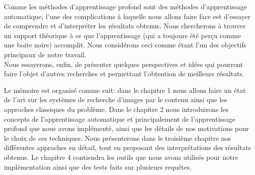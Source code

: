 	Comme les méthodes d’apprentissage profond sont des méthodes d'apprentissage automatique, l'une des complications à laquelle nous allons faire face est d'essayer de comprendre et d'interpréter les résultats obtenus. Nous chercherons à trouver un support théorique à ce que l'apprentissage (qui a toujours été perçu comme une boite noire) accomplit. Nous considérons ceci comme étant l'un des objectifs principaux de notre travail.\\


	Nous essayerons, enfin, de présenter quelques perspectives et idées qui pourront faire l'objet d'autres recherches et permettant l'obtention de meilleurs résultats.

	Le mémoire est organisé comme suit: dans le chapitre 1 nous allons faire un état de l'art sur les systèmes de recherche d'images par le contenu ainsi que les approches classiques du problème. Dans le chapitre 2 nous introduirons les concepts de l'apprentissage automatique et principalement de l'apprentissage profond que nous avons implémenté, ainsi que les détails de nos motivations pour le choix de ces techniques. Nous présenterons dans le troisième chapitre nos différentes approches en détail, tout en proposant des interprétations des résultats obtenus. Le chapitre 4 contiendra les outils que nous avons utilisés pour notre implémentation ainsi que des tests faits sur plusieurs requêtes.
